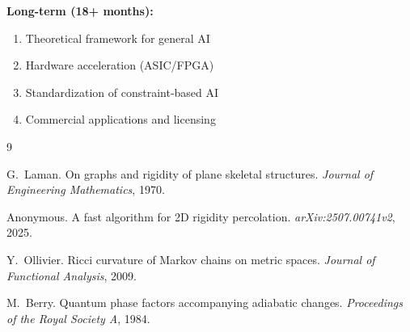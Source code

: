 \documentclass{article}
\begin{document}
\textbf{Long-term (18+ months):}
\begin{enumerate}
    \item Theoretical framework for general AI
    \item Hardware acceleration (ASIC/FPGA)
    \item Standardization of constraint-based AI
    \item Commercial applications and licensing
\end{enumerate}


\begin{thebibliography}{9}

G.~Laman.
\newblock On graphs and rigidity of plane skeletal structures.
\newblock \emph{Journal of Engineering Mathematics}, 1970.

Anonymous.
\newblock A fast algorithm for 2D rigidity percolation.
\newblock \emph{arXiv:2507.00741v2}, 2025.

Y.~Ollivier.
\newblock Ricci curvature of Markov chains on metric spaces.
\newblock \emph{Journal of Functional Analysis}, 2009.

M.~Berry.
\newblock Quantum phase factors accompanying adiabatic changes.
\newblock \emph{Proceedings of the Royal Society A}, 1984.

\end{thebibliography}
\end{document}
